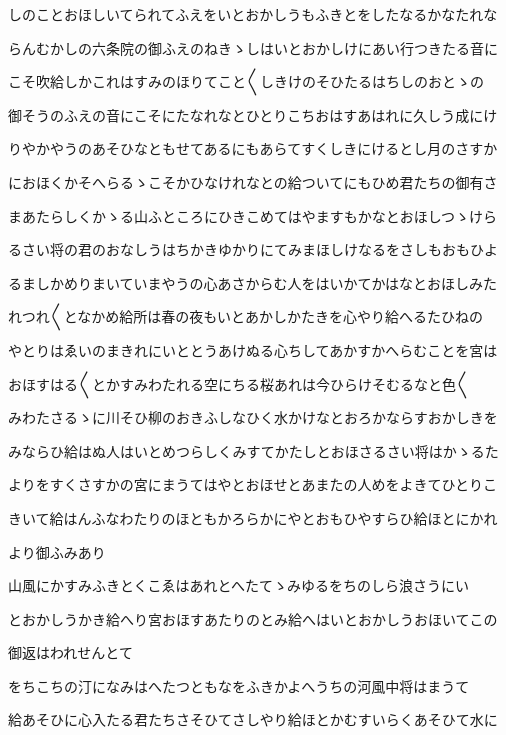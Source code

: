 \documentclass[a4paper,11pt,landscape]{ltjtarticle}
\begin{document}
\par\medskip
しのことおほしいてられてふえをいとおかしうもふきとをしたなるかなたれな
\par\medskip
らんむかしの六条院の御ふえのねきゝしはいとおかしけにあい行つきたる音に
\par\medskip
こそ吹給しかこれはすみのほりてこと〱しきけのそひたるはちしのおとゝの
\par\medskip
御そうのふえの音にこそにたなれなとひとりこちおはすあはれに久しう成にけ
\par\medskip
りやかやうのあそひなともせてあるにもあらてすくしきにけるとし月のさすか
\par\medskip
におほくかそへらるゝこそかひなけれなとの給ついてにもひめ君たちの御有さ
\par\medskip
まあたらしくかゝる山ふところにひきこめてはやますもかなとおほしつゝけら
\par\medskip
るさい将の君のおなしうはちかきゆかりにてみまほしけなるをさしもおもひよ
\par\medskip
るましかめりまいていまやうの心あさからむ人をはいかてかはなとおほしみた
\par\medskip
れつれ〱となかめ給所は春の夜もいとあかしかたきを心やり給へるたひねの
\par\medskip
やとりはゑいのまきれにいととうあけぬる心ちしてあかすかへらむことを宮は
\par\medskip
おほすはる〱とかすみわたれる空にちる桜あれは今ひらけそむるなと色〱
\par\medskip
みわたさるゝに川そひ柳のおきふしなひく水かけなとおろかならすおかしきを
\par\medskip
みならひ給はぬ人はいとめつらしくみすてかたしとおほさるさい将はかゝるた
\par\medskip
よりをすくさすかの宮にまうてはやとおほせとあまたの人めをよきてひとりこ
\par\medskip
きいて給はんふなわたりのほともかろらかにやとおもひやすらひ給ほとにかれ
\par\medskip
より御ふみあり
\par\medskip
山風にかすみふきとくこゑはあれとへたてゝみゆるをちのしら浪さうにい
\par\medskip
とおかしうかき給へり宮おほすあたりのとみ給へはいとおかしうおほいてこの
\par\medskip
御返はわれせんとて
\par\medskip
をちこちの汀になみはへたつともなをふきかよへうちの河風中将はまうて
\par\medskip
給あそひに心入たる君たちさそひてさしやり給ほとかむすいらくあそひて水に
\end{document}
